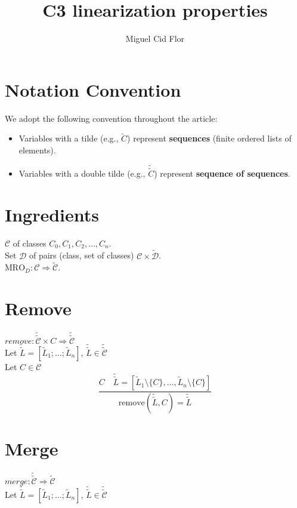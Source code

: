 \documentclass{article}
\author{Miguel Cid Flor}
\title{C3 linearization properties}
\begin{document}
\maketitle
\section*{Notation Convention}

We adopt the following convention throughout the article:

\begin{itemize}
    \item Variables with a tilde (e.g.,  $\tilde{C}$) represent \textbf{sequences} (finite ordered lists of elements).
    \item Variables with a double tilde (e.g.,  $\tilde{\tilde{C}}$) represent \textbf{sequence of sequences}.
\end{itemize}

\section*{Ingredients}

$\mathcal{C}$ of classes $C_0, C_1, C_2, \ldots, C_n$.\\
Set $\mathcal{D}$ of pairs (class, set of classes) $\mathcal{C} \times \mathcal{\tilde{D}}$.\\
$\text{MRO}_D : \mathcal{C} \Rightarrow \mathcal{\tilde{C}}$.



\section*{Remove}
$remove : \mathcal{\tilde{\tilde{C}}} \times C \Rightarrow \mathcal{\tilde{\tilde{C}}}$\\
Let $\tilde{\tilde{L}} = [\tilde{L}_1; \ldots ; \tilde{L}_n]$, $\tilde{\tilde{L}} \in \mathcal{\tilde{\tilde{C}}}$\\
Let $C \in \mathcal{C}$\\

\[
\frac{
  C \quad \tilde{\tilde{L}} = [\tilde{L}_1 \setminus \{C\}, \dots, \tilde{L}_n \setminus \{C\}]
}{
  \text{remove}(\tilde{\tilde{L}}, C) = \tilde{\tilde{L}}
}
\]

\vspace{2cm}
\section*{Merge}
$merge : \mathcal{\tilde{\tilde{C}}} \Rightarrow \tilde{\mathcal{C}} $ \\
Let $\tilde{\tilde{L}} = [\tilde{L}_1; \ldots ; \tilde{L}_n]$, $\tilde{\tilde{L}} \in \mathcal{\tilde{\tilde{C}}}$\\
\end{document}
